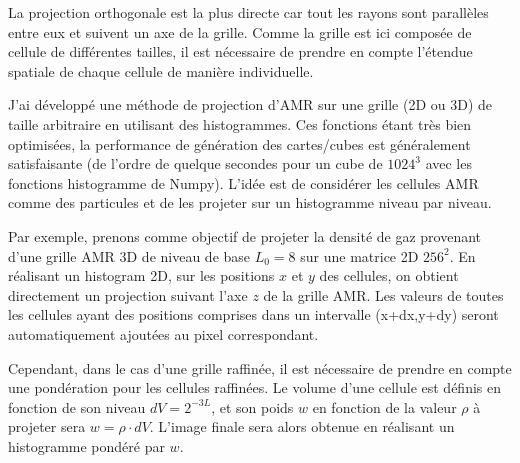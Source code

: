 La projection orthogonale est la plus directe car tout les rayons sont parallèles entre eux et suivent un axe de la grille.
Comme la grille est ici composée de cellule de différentes tailles, il est nécessaire de prendre en compte l'étendue spatiale de chaque cellule de manière individuelle.

J'ai développé une méthode de projection d'\ac{AMR} sur une grille (2D ou 3D) de taille arbitraire en utilisant des histogrammes.
Ces fonctions étant très bien optimisées, la performance de génération des cartes/cubes est généralement satisfaisante (de l'ordre de quelque secondes pour un cube de $1024^3$ avec les fonctions histogramme de Numpy).
L'idée est de considérer les cellules \ac{AMR} comme des particules et de les projeter sur un histogramme niveau par niveau.


Par exemple, prenons comme objectif de projeter la densité de gaz provenant d'une grille \ac{AMR} 3D de niveau de base $L_{0}=8$ sur une matrice 2D $256^2$.
En réalisant un histogram 2D, sur les positions $x$ et $y$ des cellules, on obtient directement un projection suivant l'axe $z$ de la grille \ac{AMR}.
Les valeurs de toutes les cellules ayant des positions comprises dans un intervalle (x+dx,y+dy) seront automatiquement ajoutées au pixel correspondant.

Cependant, dans le cas d'une grille raffinée, il est nécessaire de prendre en compte une pondération pour les cellules raffinées.
Le volume d'une cellule est définis en fonction de son niveau $dV= 2^{-3L}$, et son poids $w$ en fonction de la valeur $\rho$ à projeter sera $w = \rho \cdot dV$.
L'image finale sera alors obtenue en réalisant un histogramme pondéré par $w$.






